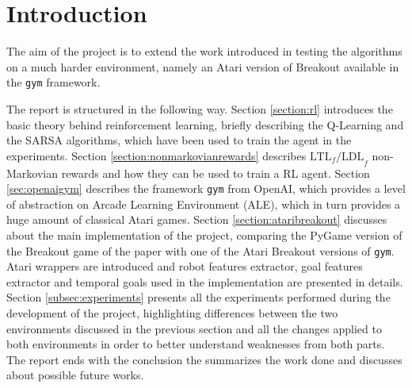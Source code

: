 \section{Introduction}
The aim of the project is to extend the work introduced in
\cite{DBLP:journals/corr/abs-1807-06333} testing the algorithms on a much
harder environment, namely an Atari version of Breakout available in the
\texttt{gym} framework.

The report is structured in the following way. Section \ref{section:rl}
introduces the basic theory behind reinforcement learning, briefly describing
the Q-Learning and the SARSA algorithms, which have been used to train the
agent in the experiments. Section \ref{section:nonmarkovianrewards}
describes $\text{LTL}_f\text{/LDL}_f$ non-Markovian rewards and how they can
be used to train a RL agent. Section \ref{sec:openaigym} describes the
framework \texttt{gym} from OpenAI, which provides a level of abstraction
on Arcade Learning Environment (ALE), which in turn provides a huge amount
of classical Atari games. Section \ref{section:ataribreakout} discusses about
the main implementation of the project, comparing the PyGame version of the
Breakout game of the paper with one of the Atari Breakout versions of
\texttt{gym}. Atari wrappers are introduced and robot features extractor,
goal features extractor and temporal goals used in the implementation are
presented in details. Section \ref{subsec:experiments} presents all the
experiments performed during the development of the project, highlighting
differences between the two environments discussed in the previous section
and all the changes applied to both environments in order to better
understand weaknesses from both parts. The report ends with the
conclusion the summarizes the work done and discusses about possible
future works.
